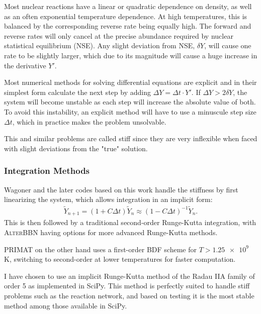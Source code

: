 Most nuclear reactions have a linear or quadratic dependence on density, as well as an often exponential temperature dependence. At high temperatures, this is balanced by the corresponding reverse rate being equally high. The forward and reverse rates will only cancel at the precise abundance required by nuclear statistical equilibrium (NSE). Any slight deviation from NSE, $\delta Y$, will cause one rate to be slightly larger, which due to its magnitude will cause a huge increase in the derivative $Y'$.

Most numerical methods for solving differential equations are explicit and in their simplest form calculate the next step by adding  $\Delta Y = \Delta t \cdot Y' $. 
If $\Delta Y>2\delta Y$, the system will become unstable as each step will increase the absolute value of both. To avoid this instability, an explicit method will have to use a minuscule step size $\Delta t$, which in practice makes the problem unsolvable. 

This and similar problems are called stiff since they are very inflexible when faced with slight deviations from the "true" solution. 


\subsubsection{Integration Methods}

Wagoner and the later codes based on this work handle the stiffness by first linearizing the system, which allows integration in an implicit form:
\begin{align}
    \tilde{Y}_{n+1}=(1+C \Delta t)\tilde{Y}_{n}\approx(1-C \Delta t)^{-1}\tilde{Y}_{n}.
\end{align}
This is then followed by a traditional second-order Runge-Kutta integration, with \textsc{AlterBBN} having options for more advanced Runge-Kutta methods. 

PRIMAT on the other hand uses a first-order BDF scheme for $T>\num{1.25e9}$ K, switching to second-order at lower temperatures for faster computation.

I have chosen to use an implicit Runge-Kutta method of the Radau IIA family of order 5 as implemented in SciPy\cite{SciPy}. This method is perfectly suited to handle stiff problems such as the reaction network, and based on testing it is the most stable method among those available in SciPy.

